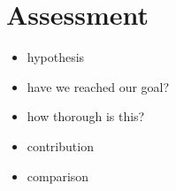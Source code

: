 \chapter{Assessment}
\label{chp:assessment}

\begin{itemize}
\item hypothesis
\item have we reached our goal?
\item how thorough is this?
\item contribution
\item comparison
\end{itemize}
